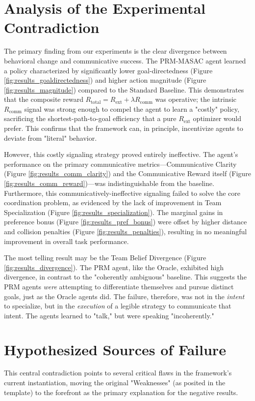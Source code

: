 \documentclass[12pt, a4paper]{report}
\newcommand{\Rcomm}{R_{\text{comm}}}
\newcommand{\Rext}{R_{\text{ext}}}
\newcommand{\Rtotal}{R_{\text{total}}}
\begin{document}
\section{Analysis of the Experimental Contradiction}
The primary finding from our experiments is the clear divergence between behavioral change and communicative success. The PRM-MASAC agent learned a policy characterized by significantly lower goal-directedness (Figure \ref{fig:results_goaldirectedness}) and higher action magnitude (Figure \ref{fig:results_magnitude}) compared to the Standard Baseline. This demonstrates that the composite reward $\Rtotal = \Rext + \lambda \Rcomm$ was operative; the intrinsic $\Rcomm$ signal was strong enough to compel the agent to learn a "costly" policy, sacrificing the shortest-path-to-goal efficiency that a pure $\Rext$ optimizer would prefer. This confirms that the framework can, in principle, incentivize agents to deviate from "literal" behavior.

However, this costly signaling strategy proved entirely ineffective. The agent's performance on the primary communicative metrics---Communicative Clarity (Figure \ref{fig:results_comm_clarity}) and the Communicative Reward itself (Figure \ref{fig:results_comm_reward})---was indistinguishable from the baseline. Furthermore, this communicatively-ineffective signaling failed to solve the core coordination problem, as evidenced by the lack of improvement in Team Specialization (Figure \ref{fig:results_specialization}). The marginal gains in preference bonus (Figure \ref{fig:results_pref_bonus}) were offset by higher distance and collision penalties (Figure \ref{fig:results_penalties}), resulting in no meaningful improvement in overall task performance.

The most telling result may be the Team Belief Divergence (Figure \ref{fig:results_divergence}). The PRM agent, like the Oracle, exhibited high divergence, in contrast to the "coherently ambiguous" baseline. This suggests the PRM agents \textit{were} attempting to differentiate themselves and pursue distinct goals, just as the Oracle agents did. The failure, therefore, was not in the \textit{intent} to specialize, but in the \textit{execution} of a legible strategy to communicate that intent. The agents learned to "talk," but were speaking "incoherently."

\section{Hypothesized Sources of Failure}
This central contradiction points to several critical flaws in the framework's current instantiation, moving the original "Weaknesses" (as posited in the template) to the forefront as the primary explanation for the negative results.
\end{document}
